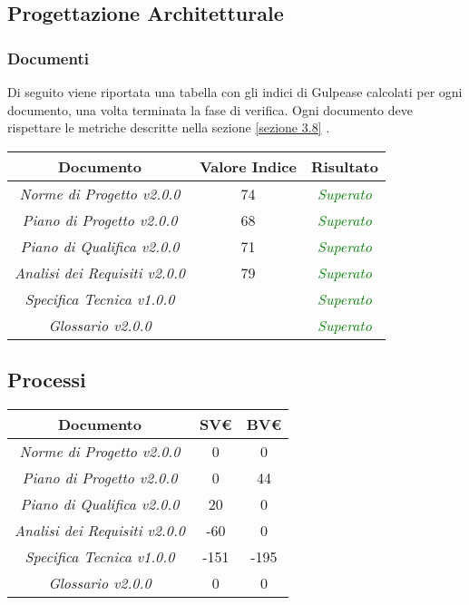 \subsection{Progettazione Architetturale}
\subsubsection{Documenti}
\label{appendice 3}

Di seguito viene riportata una tabella con gli indici di \gls{Gulpease} calcolati per ogni documento, una volta terminata la fase di verifica. Ogni documento deve rispettare le metriche descritte nella sezione \ref{sezione 3.8} .\\

\hspace{1cm}

\begin{center}
	\begin{tabular}{|c|c|c|}
		\hline 
		\textbf{Documento} & \textbf{Valore Indice} & \textbf{Risultato} \\ 
		\hline
		\textit{Norme di Progetto v2.0.0} & 74 & \textcolor{green}{\textit{Superato}} \\  
		\textit{Piano di Progetto v2.0.0} & 68 & \textcolor{green}{\textit{Superato}} \\ 
		\textit{Piano di Qualifica v2.0.0} & 71 & \textcolor{green}{\textit{Superato}} \\ 
		\textit{Analisi dei Requisiti v2.0.0} & 79 & \textcolor{green}{\textit{Superato}} \\
		\textit{Specifica Tecnica v1.0.0} & & \textcolor{green}{\textit{Superato}} \\ 
		\textit{Glossario v2.0.0} & & \textcolor{green}{\textit{Superato}} \\ 
		\hline 
	\end{tabular}
\end{center}

\subsection{Processi}
\label{appendice 4}
\vspace{3mm}

\begin{center}
	\begin{tabular}{|c|c|c|}
		\toprule
			\textbf{Documento} & \textbf{SV€} & \textbf{BV€} \\ 
		\midrule
		\midrule
			\textit{Norme di Progetto v2.0.0} & 0 & 0 \\  
			\textit{Piano di Progetto v2.0.0} & 0 & 44 \\ 
			\textit{Piano di Qualifica v2.0.0} & 20 & 0 \\ 
			\textit{Analisi dei Requisiti v2.0.0} & -60 & 0 \\
			\textit{Specifica Tecnica v1.0.0} & -151 & -195 \\ 
			\textit{Glossario v2.0.0} & 0 & 0 \\ 
		\bottomrule
	\end{tabular}
\end{center}